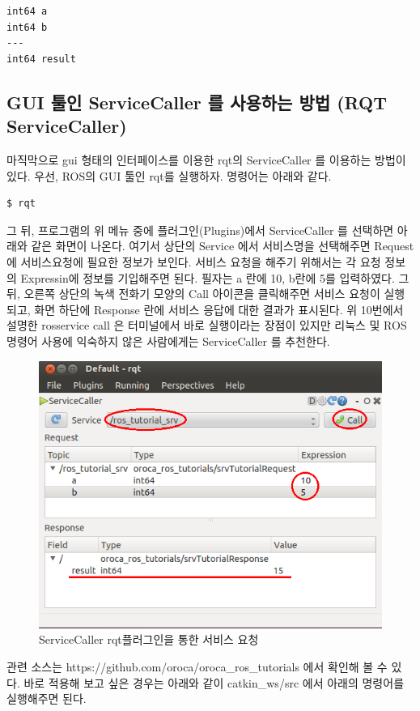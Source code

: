 \begin{lstlisting}[language=ROS]
int64 a
int64 b
---
int64 result
\end{lstlisting}

\subsection{GUI 툴인 ServiceCaller 를 사용하는 방법 (RQT ServiceCaller)}

마직막으로 gui 형태의 인터페이스를 이용한 rqt의 ServiceCaller 를 이용하는 방법이 있다. 우선, ROS의 GUI 툴인 rqt를 실행하자. 명령어는 아래와 같다.

\begin{lstlisting}[language=ROS]
$ rqt
\end{lstlisting}

그 뒤, 프로그램의 위 메뉴 중에 플러그인(Plugins)에서 ServiceCaller 를 선택하면 아래와 같은 화면이 나온다. 여기서 상단의 Service 에서 서비스명을 선택해주면 Request 에 서비스요청에 필요한 정보가 보인다. 서비스 요청을 해주기 위해서는 각 요청 정보의 Expressin에 정보를 기입해주면 된다. 필자는 a 란에 10, b란에 5를 입력하였다. 그 뒤, 오른쪽 상단의 녹색 전화기 모양의 Call 아이콘을 클릭해주면 서비스 요청이 실행되고, 화면 하단에 Response 란에 서비스 응답에 대한 결과가 표시된다. 위 10번에서 설명한 rosservice call 은 터미널에서 바로 실행이라는 장점이 있지만 리눅스 및 ROS 명령어 사용에 익숙하지 않은 사람에게는 ServiceCaller 를 추천한다.

\begin{figure}[h]
\centering\includegraphics[width=0.7\columnwidth]{pictures/chapter7/rqt_service_caller.png}
\caption{ServiceCaller rqt플러그인을 통한 서비스 요청}
\end{figure}

관련 소스는 https://github.com/oroca/oroca\_ros\_tutorials 에서 확인해 볼 수 있다. 바로 적용해 보고 싶은 경우는 아래와 같이 catkin\_ws/src 에서 아래의 명령어를 실행해주면 된다.

